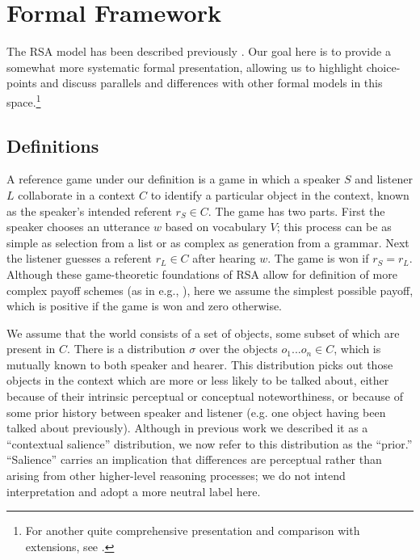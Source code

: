 \documentclass[man,noapacite]{apa2}
\begin{document}
\section{Formal Framework} \label{sec:models-intro}

The RSA model has been described previously \cite{frank2012,goodman2013}. Our goal here is to provide a somewhat more systematic formal presentation, allowing us to highlight choice-points and discuss parallels and differences with other formal models in this space.\footnote{For another quite comprehensive presentation and comparison with extensions, see .}



\subsection{Definitions}

A reference game under our definition is a game in which a speaker $S$ and listener $L$ collaborate in a context $C$ to identify a particular object in the context, known as the speaker's intended referent $r_S \in C$. The game has two parts. First the speaker chooses an utterance $w$ based on vocabulary $V$; this process can be as simple as selection from a list or as complex as generation from a grammar. Next the listener guesses a referent $r_L \in C$ after hearing $w$. The game is won if $r_S=r_L$. Although these game-theoretic foundations of RSA allow for definition of more complex payoff schemes (as in e.g., ), here we assume the simplest possible payoff, which is positive if the game is won and zero otherwise.

We assume that the world consists of a set of objects, some subset of which are present in $C$. There is a distribution $\sigma$ over the objects ${o_1 ... o_n} \in C$, which is mutually known to both speaker and hearer. This distribution picks out those objects in the context which are more or less likely to be talked about, either because of their intrinsic perceptual or conceptual noteworthiness, or because of some prior history between speaker and listener (e.g. one object having been talked about previously). Although in previous work we described it as a ``contextual salience'' distribution, we now refer to this distribution as the ``prior.''  ``Salience'' carries an implication that differences are perceptual rather than arising from other higher-level reasoning processes; we do not intend interpretation and adopt a more neutral label here.
\end{document}
